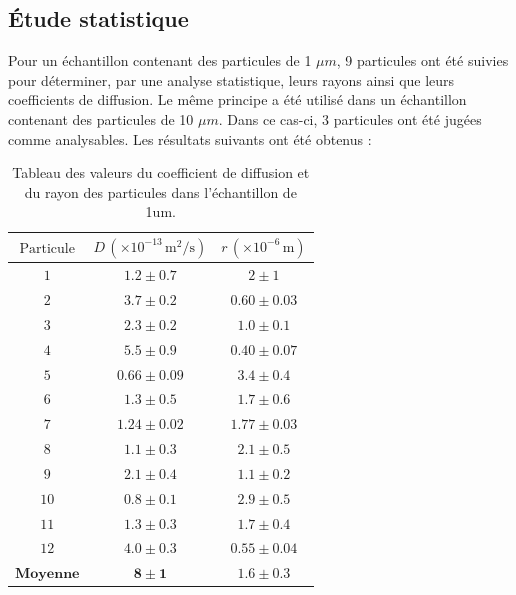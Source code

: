 \documentclass[11pt,letterpaper]{article}
\begin{document}
\subsection{Étude statistique}
Pour un échantillon contenant des particules de 1 $\mu m$, 9 particules ont été suivies pour déterminer, par une analyse statistique, leurs rayons ainsi que leurs coefficients de diffusion. 
Le même principe a été utilisé dans un échantillon contenant des particules de 10 $\mu m$. Dans ce cas-ci, 3 particules ont été jugées comme analysables. 
Les résultats suivants ont été obtenus :

\begin{table}[H]
  \centering
  \caption{Tableau des valeurs du coefficient de diffusion et du rayon des particules dans l'échantillon de 1um.}
  \begin{tabular}{|c|c|c|}
  \hline
  \( \text{Particule} \) &\( D \, (\times 10^{-13} \, \text{m}^2/\text{s}) \) & \( r \, (\times 10^{-6} \, \text{m}) \) \\
  \hline
  \( 1 \) &\( 1.2 \pm 0.7 \) & \( 2 \pm 1 \) \\
  \( 2 \) &\( 3.7 \pm 0.2 \) & \( 0.60 \pm 0.03 \) \\
  \( 3 \) &\( 2.3 \pm 0.2 \) & \( 1.0 \pm 0.1 \) \\
  \( 4 \) &\( 5.5 \pm 0.9 \) & \( 0.40 \pm 0.07 \) \\
  \( 5 \) &\( 0.66 \pm 0.09 \) & \( 3.4 \pm 0.4 \) \\
  \( 6 \) &\( 1.3 \pm 0.5 \) & \( 1.7 \pm 0.6 \) \\
  \( 7 \) &\( 1.24 \pm 0.02 \) & \( 1.77 \pm 0.03 \) \\
  \( 8 \) &\( 1.1 \pm 0.3 \) & \( 2.1 \pm 0.5 \) \\
  \( 9 \) &\( 2.1 \pm 0.4 \) & \( 1.1 \pm 0.2 \) \\
  \( 10 \) &\( 0.8 \pm 0.1 \) & \( 2.9 \pm 0.5 \) \\
  \( 11 \) &\( 1.3 \pm 0.3 \) & \( 1.7 \pm 0.4 \) \\
  \( 12 \) &\( 4.0 \pm 0.3 \) & \( 0.55 \pm 0.04 \) \\
  \hline
  \hline
  \( \textbf{Moyenne} \) & \( \mathbf{8 \pm 1} \) & \( \mathbf{1.6 \pm 0.3} \) \\
  \hline
  \end{tabular}
\end{table}
\end{document}
